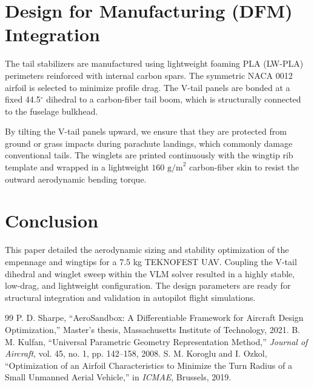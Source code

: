 \documentclass[11pt]{article}
\begin{document}
\section{Design for Manufacturing (DFM) Integration}
The tail stabilizers are manufactured using lightweight foaming PLA (LW-PLA) perimeters reinforced with internal carbon spars. The symmetric NACA 0012 airfoil is selected to minimize profile drag. The V-tail panels are bonded at a fixed 44.5$^\circ$ dihedral to a carbon-fiber tail boom, which is structurally connected to the fuselage bulkhead. 

By tilting the V-tail panels upward, we ensure that they are protected from ground or grass impacts during parachute landings, which commonly damage conventional tails. The winglets are printed continuously with the wingtip rib template and wrapped in a lightweight $160\text{ g/m}^2$ carbon-fiber skin to resist the outward aerodynamic bending torque.

\section{Conclusion}
This paper detailed the aerodynamic sizing and stability optimization of the empennage and wingtips for a 7.5 kg TEKNOFEST UAV. Coupling the V-tail dihedral and winglet sweep within the VLM solver resulted in a highly stable, low-drag, and lightweight configuration. The design parameters are ready for structural integration and validation in autopilot flight simulations.

\begin{thebibliography}{99}
P. D. Sharpe, ``AeroSandbox: A Differentiable Framework for Aircraft Design Optimization,'' Master's thesis, Massachusetts Institute of Technology, 2021.
B. M. Kulfan, ``Universal Parametric Geometry Representation Method,'' \textit{Journal of Aircraft}, vol. 45, no. 1, pp. 142--158, 2008.
S. M. Koroglu and I. Ozkol, ``Optimization of an Airfoil Characteristics to Minimize the Turn Radius of a Small Unmanned Aerial Vehicle,'' in \textit{ICMAE}, Brussels, 2019.
\end{thebibliography}
\end{document}
